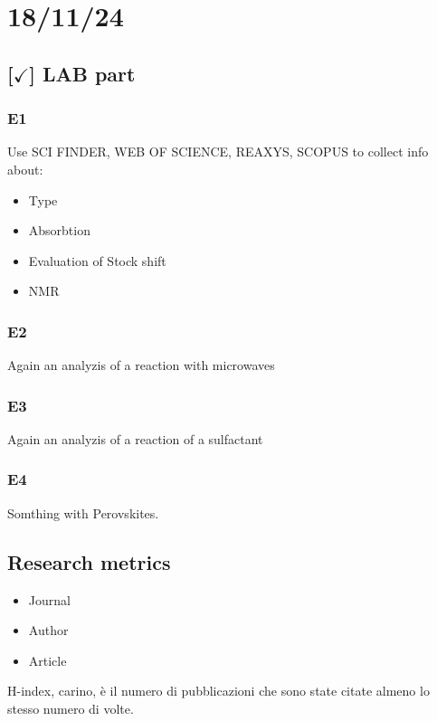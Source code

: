 \section{18/11/24}

\subsection{[$\checkmark$] LAB part}

\subsubsection{E1}

Use SCI FINDER, WEB OF SCIENCE, REAXYS, SCOPUS to collect info about:

\begin{itemize}
    \item Type
    \item Absorbtion
    \item Evaluation of Stock shift
    \item NMR
\end{itemize}

\subsubsection{E2}

Again an analyzis of a reaction with microwaves

\subsubsection{E3}

Again an analyzis of a reaction of a sulfactant

\subsubsection{E4}

Somthing with Perovskites.


\subsection{Research metrics}

\begin{itemize}
    \item Journal
    \item Author
    \item Article
\end{itemize}

H-index, carino, è il numero di pubblicazioni che sono state citate almeno lo stesso numero di volte.